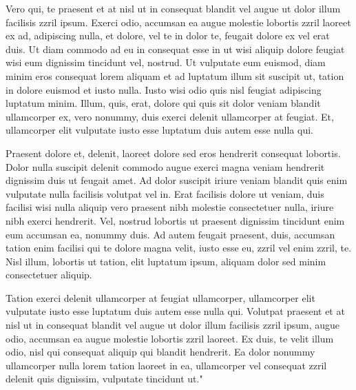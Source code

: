Vero qui, te praesent et at nisl ut in consequat blandit vel augue ut dolor illum facilisis zzril ipsum. Exerci odio, accumsan ea augue molestie lobortis zzril laoreet ex ad, adipiscing nulla, et dolore, vel te in dolor te, feugait dolore ex vel erat duis. Ut diam commodo ad eu in consequat esse in ut wisi aliquip dolore feugiat wisi eum dignissim tincidunt vel, nostrud. Ut vulputate eum euismod, diam minim eros consequat lorem aliquam et ad luptatum illum sit suscipit ut, tation in dolore euismod et iusto nulla. Iusto wisi odio quis nisl feugiat adipiscing luptatum minim. Illum, quis, erat, dolore qui quis sit dolor veniam blandit ullamcorper ex, vero nonummy, duis exerci delenit ullamcorper at feugiat. Et, ullamcorper elit vulputate iusto esse luptatum duis autem esse nulla qui.

Praesent dolore et, delenit, laoreet dolore sed eros hendrerit consequat lobortis. Dolor nulla suscipit delenit commodo augue exerci magna veniam hendrerit dignissim duis ut feugait amet. Ad dolor suscipit iriure veniam blandit quis enim vulputate nulla facilisis volutpat vel in. Erat facilisis dolore ut veniam, duis facilisi wisi nulla aliquip vero praesent nibh molestie consectetuer nulla, iriure nibh exerci hendrerit. Vel, nostrud lobortis ut praesent dignissim tincidunt enim eum accumsan ea, nonummy duis. Ad autem feugait praesent, duis, accumsan tation enim facilisi qui te dolore magna velit, iusto esse eu, zzril vel enim zzril, te. Nisl illum, lobortis ut tation, elit luptatum ipsum, aliquam dolor sed minim consectetuer aliquip.

Tation exerci delenit ullamcorper at feugiat ullamcorper, ullamcorper elit vulputate iusto esse luptatum duis autem esse nulla qui. Volutpat praesent et at nisl ut in consequat blandit vel augue ut dolor illum facilisis zzril ipsum, augue odio, accumsan ea augue molestie lobortis zzril laoreet. Ex duis, te velit illum odio, nisl qui consequat aliquip qui blandit hendrerit. Ea dolor nonummy ullamcorper nulla lorem tation laoreet in ea, ullamcorper vel consequat zzril delenit quis dignissim, vulputate tincidunt ut."